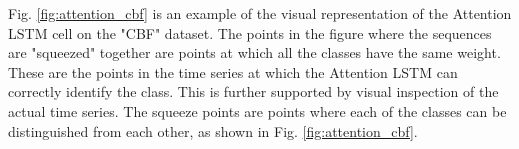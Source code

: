 \documentclass[article]{IEEEtran}
\begin{document}
Fig. \ref{fig:attention_cbf} is an example of the visual representation of the Attention LSTM cell on the "CBF" dataset.  The points in the figure where the sequences are "squeezed" together are points at which all the classes have the same weight. These are the points in the time series at which the Attention LSTM can correctly identify the class. This is further supported by visual inspection of the actual time series. The squeeze points are points where each of the classes can be distinguished from each other, as shown in Fig. \ref{fig:attention_cbf}.
















 \newcommand\mcxl[1]{\multicolumn{1}{|C|}{\bfseries #1}}
 \newcommand\mcx[1]{\multicolumn{1}{C }{\bfseries #1}}
 
\end{document}
